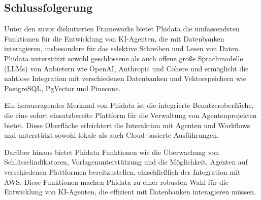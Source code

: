\subsection{Schlussfolgerung}

Unter den zuvor diskutierten Frameworks bietet Phidata die umfassendsten Funktionen für die Entwicklung von KI-Agenten, die mit Datenbanken interagieren, insbesondere für das selektive Schreiben und Lesen von Daten. Phidata unterstützt sowohl geschlossene als auch offene große Sprachmodelle (LLMs) von Anbietern wie OpenAI, Anthropic und Cohere und ermöglicht die nahtlose Integration mit verschiedenen Datenbanken und Vektorspeichern wie PostgreSQL, PgVector und Pinecone.\cite{aisharenet-kitools}

Ein herausragendes Merkmal von Phidata ist die integrierte Benutzeroberfläche, die eine sofort einsatzbereite Plattform für die Verwaltung von Agentenprojekten bietet. Diese Oberfläche erleichtert die Interaktion mit Agenten und Workflows und unterstützt sowohl lokale als auch Cloud-basierte Ausführungen.\cite{aisharenet-kitools}

Darüber hinaus bietet Phidata Funktionen wie die Überwachung von Schlüsselindikatoren, Vorlagenunterstützung und die Möglichkeit, Agenten auf verschiedenen Plattformen bereitzustellen, einschließlich der Integration mit AWS. Diese Funktionen machen Phidata zu einer robusten Wahl für die Entwicklung von KI-Agenten, die effizient mit Datenbanken interagieren müssen.\cite{aisharenet-kitools}